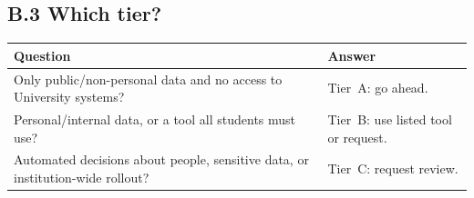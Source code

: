 \subsection*{B.3 Which tier?}
\begin{center}
\small
\begin{tabular}{@{}p{7.5cm}p{3cm}@{}}
\toprule
Question & Answer \\
\midrule
Only public/non-personal data and no access to University systems? & Tier~A: go ahead. \\
Personal/internal data, or a tool all students must use? & Tier~B: use listed tool or request. \\
Automated decisions about people, sensitive data, or institution-wide rollout? & Tier~C: request review. \\
\bottomrule
\end{tabular}
\end{center}
